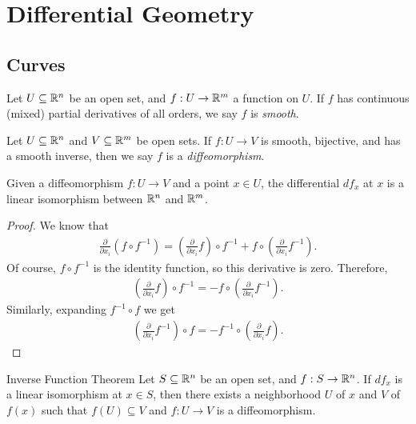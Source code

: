 \setchaptergraphic{}

\chapter{Differential Geometry}
\label{ch:diffgeo}

\section{Curves}

\begin{defn}
    Let $U \subseteq \mathbb{R}^n$ be an open set, and $f: U \to \mathbb{R}^m$ a function on $U$. If $f$ has continuous (mixed) partial derivatives of all orders, we say $f$ is \emph{smooth}.
\end{defn}

\begin{defn}
    Let $U \subseteq \mathbb{R}^n$ and $V \subseteq \mathbb{R}^m$ be open sets. If $f: U \to V$ is smooth, bijective, and has a smooth inverse, then we say $f$ is a \emph{diffeomorphism}.
\end{defn}

\begin{prop}
    Given a diffeomorphism $f: U \to V$ and a point $x \in U$, the differential $df_x$ at $x$ is a linear isomorphism between $\mathbb{R}^n$ and $\mathbb{R}^m$.
\end{prop}

\begin{proof}
    We know that
    \begin{align*}
        \frac{\partial}{\partial x_i}\left(f \circ f^{-1}\right) = \left(\frac{\partial}{\partial x_i}f\right) \circ f^{-1} + f \circ \left(\frac{\partial}{\partial x_i}f^{-1}\right).
    \end{align*}
    Of course, $f \circ f^{-1}$ is the identity function, so this derivative is zero. Therefore,
    \begin{align*}
        \left(\frac{\partial}{\partial x_i}f\right) \circ f^{-1} = -f \circ \left(\frac{\partial}{\partial x_i}f^{-1}\right).
    \end{align*}
    Similarly, expanding $f^{-1} \circ f$ we get
    \begin{align*}
        \left(\frac{\partial}{\partial x_i}f^{-1}\right) \circ f = -f^{-1} \circ \left(\frac{\partial}{\partial x_i}f\right).
    \end{align*}
\end{proof}

\begin{thm}{Inverse Function Theorem}\label{thm:inverse-function}\proofbreak
    Let $S \subseteq \mathbb{R}^n$ be an open set, and $f: S \to \mathbb{R}^n$. If $df_x$ is a linear isomorphism at $x \in S$, then there exists a neighborhood $U$ of $x$ and $V$ of $f(x)$ such that $f(U) \subseteq V$ and $f: U \to V$ is a diffeomorphism.
\end{thm}

